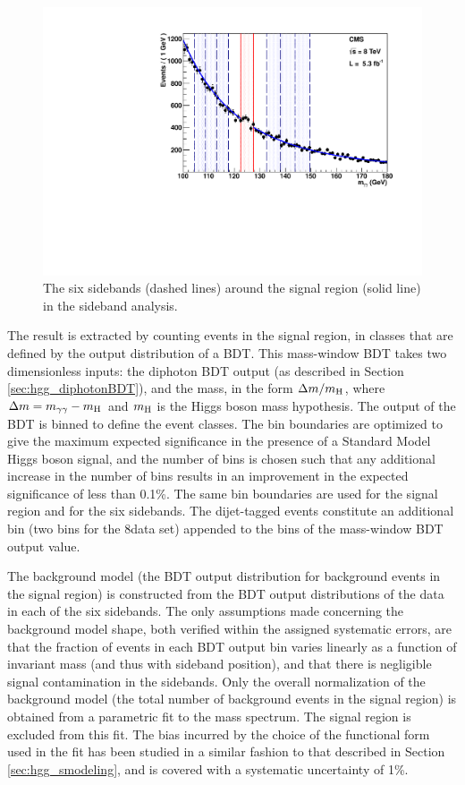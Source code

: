\documentclass[12pt,twoside,a4paper,cmspaper,final,collab]{cms-tdr}
\begin{document}
\begin{figure}[htbp]
  \begin{center}
    \includegraphics[width=0.60\linewidth]{figures/fit_m125_0-1GeV}
    \caption{The six sidebands (dashed lines) around the signal region
      (solid line) in the sideband analysis. }
    \label{fig:hgg_sidebands}
  \end{center}
\end{figure}

The result is extracted by counting events in the signal region, in classes
that are defined by the output distribution of a BDT.
This mass-window BDT takes two dimensionless inputs: the diphoton BDT output (as described in
Section \ref{sec:hgg_diphotonBDT}), and the mass, in the form $\Delta m/m_{\mathrm{H}}$, where
$\Delta m =m_{\gamma\gamma} - m_{\mathrm{H}}$ and $m_{\mathrm{H}}$ is the Higgs boson mass hypothesis.
The output of the BDT is binned to define the event classes.
The bin boundaries are optimized to give the maximum expected significance in the presence of a Standard Model
Higgs boson signal, and the number of bins is chosen such that any additional increase in the number of bins
results in an improvement in the expected significance of less than 0.1\%.
The same bin boundaries are used for the signal region and for the six sidebands.
The dijet-tagged events constitute an additional bin (two bins for the 8\TeV data set)
appended to the bins of the mass-window BDT output value.

The background model (\ie the BDT output distribution for background events in the signal region) is constructed
from the BDT output distributions of the data in each of the six sidebands.
The only assumptions made concerning the background model shape, both verified within the assigned systematic errors,
are that the fraction of events in each BDT output bin varies linearly as a function of invariant mass
(and thus with sideband position), and that there is negligible signal contamination in the sidebands.
Only the overall normalization of the background model (the total number of background events in the signal region) is obtained from
a parametric fit to the mass spectrum. The signal region is excluded from this fit.  The bias incurred by the choice of the functional form used in the fit has been studied in a similar fashion to that described in Section \ref{sec:hgg_smodeling}, and is covered with a systematic uncertainty of 1\%.
\end{document}
